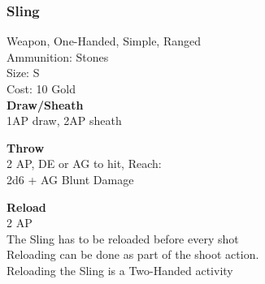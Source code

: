 \subsubsection{Sling}\label{weapon:sling}
Weapon, One-Handed, Simple, Ranged\\
Ammunition: Stones\\
Size: S\\
Cost: 10 Gold\\

\textbf{Draw/Sheath}\\
1AP draw, 2AP sheath

\textbf{Throw}\\
2 AP, DE or AG to hit,  Reach:\\
2d6 + \texttimes AG Blunt Damage

\textbf{Reload}\\
2 AP\\
The Sling has to be reloaded before every shot\\
Reloading can be done as part of the shoot action.\\
Reloading the Sling is a Two-Handed activity

